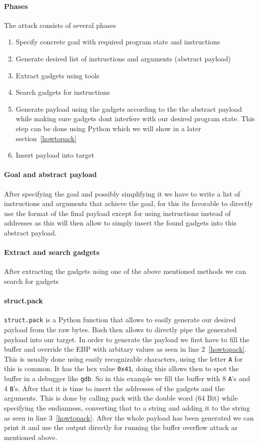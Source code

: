 \documentclass[journal=tosc,submission, notanonymous]{iacrtrans}
\begin{document}
\paragraph{Phases}
The attack consists of several phases
\begin{enumerate}
  \item Specify concrete goal with required program state and instructions
  \item Generate desired list of instructions and arguments (abstract payload)
  \item Extract gadgets using tools
  \item Search gadgets for instructions
  \item Generate payload using the gadgets according to the the abstract payload while making sure gadgets dont interfere with our desired program state. This step can be done using Python which we will show in a later section~\cref{howtopack}
  \item Insert payload into target
\end{enumerate}
\paragraph{Goal and abstract payload}
After specifying the goal and possibly simplifying it we have to write a list of instructions and arguments that achieve the goal, for this its favorable to directly use the format of the final payload except for using instructions instead of addresses as this will then allow to simply insert the found gadgets into this abstract payload.
\paragraph{Extract and search gadgets}
After extracting the gadgets using one of the above mentioned methods we can search for gadgets
\paragraph{struct.pack}
\Verb+struct.pack+ is a Python function that allows to easily generate our desired payload from the raw bytes. Bash then allows to directly pipe the generated payload into our target. In order to generate the payload we first have to fill the buffer and override the EBP with arbitary values as seen in line 2~\cref{howtopack}. This is usually done using easily recognizable characters, using the letter \Verb+A+ for this is common. It has the hex value \Verb+0x41+, doing this allows then to spot the buffer in a debugger like \Verb+gdb+. So in this example we fill the buffer with 8 \Verb+A+'s and 4 \Verb+B+'s. After that it is time to insert the addresses of the gadgets and the arguments. This is done by calling pack with the double word (64 Bit) while specifying the endianness, converting that to a string and adding it to the string as seen in line 3~\cref{howtopack}. After the whole payload has been generated we can print it and use the output directly for running the buffer overflow attack as mentioned above.
\end{document}
